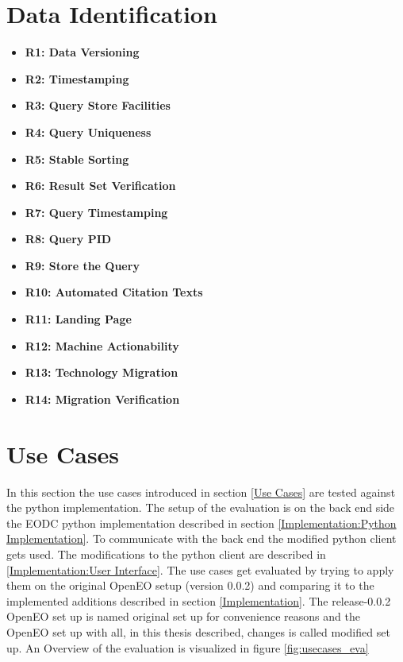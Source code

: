 \documentclass[draft,final]{vutinfth} %
\begin{document}
\section{Data Identification}\label{Evaluation:Data Identification}
\begin{itemize}
	\item \textbf{R1: Data Versioning}
	\item \textbf{R2: Timestamping}
	\item \textbf{R3: Query Store Facilities}
	\item \textbf{R4: Query Uniqueness}
	\item \textbf{R5: Stable Sorting}
	\item \textbf{R6: Result Set Verification}
	\item \textbf{R7: Query Timestamping}
	\item \textbf{R8: Query PID}
	\item \textbf{R9: Store the Query}
	\item \textbf{R10: Automated Citation Texts}
	\item \textbf{R11: Landing Page}
	\item \textbf{R12: Machine Actionability}
	\item \textbf{R13: Technology Migration}
	\item \textbf{R14: Migration Verification}
\end{itemize}


 

\section{Use Cases}\label{Evaluation:Use Cases}
In this section the use cases introduced in section \ref{Use Cases} are tested against the python implementation. The setup of the evaluation is on the back end side the EODC python implementation described in section \ref{Implementation:Python Implementation}. To communicate with the back end the modified python client gets used. The modifications to the python client are described in \ref{Implementation:User Interface}. The use cases get evaluated by trying to apply them on the original OpenEO setup (version 0.0.2) and comparing it to the implemented additions described in section \ref{Implementation}. The release-0.0.2 OpenEO set up is named original set up for convenience reasons and the OpenEO set up with all, in this thesis described, changes is called modified set up. An Overview of the evaluation is visualized in figure \ref{fig:usecases_eva} 
\end{document}
